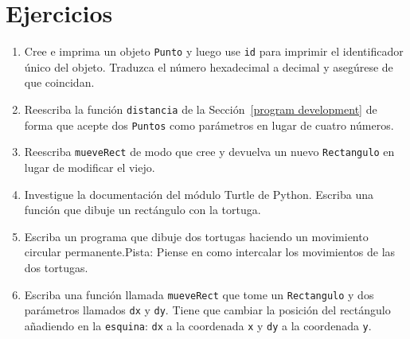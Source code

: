 \section{Ejercicios}

\begin{enumerate}
\item  Cree e imprima un objeto \texttt{Punto} y luego use
\texttt{id} para imprimir el identificador único del objeto. Traduzca 
el número hexadecimal a decimal y asegúrese de que coincidan.

\item  Reescriba la función \texttt{distancia} de la
Sección~\ref{program development} de forma que acepte dos \texttt{Puntos} como
parámetros en lugar de cuatro números.

\item Reescriba \texttt{mueveRect} de modo que cree y devuelva
un nuevo \texttt{Rectangulo} en lugar de modificar el viejo.

\item Investigue la documentación del módulo Turtle de Python. 
Escriba una función que dibuje un rectángulo con la tortuga.

\item Escriba un programa que dibuje dos tortugas haciendo un movimiento circular 
permanente.Pista: Piense en como intercalar los movimientos de las dos tortugas.

\item Escriba una función llamada \texttt{mueveRect} que tome
un \texttt{Rectangulo} y dos parámetros llamados \texttt{dx} y \texttt{dy}. 
Tiene que cambiar la posición del rectángulo añadiendo en la  \texttt{esquina}: 
\texttt{dx} a la coordenada \texttt{x}  y  \texttt{dy} a la coordenada \texttt{y}.

\end{enumerate}
